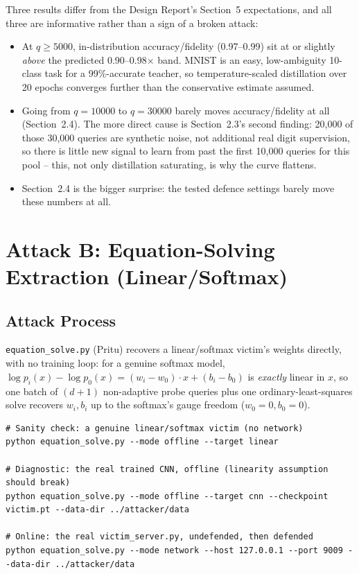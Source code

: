 \documentclass[11pt]{article}
\begin{document}
Three results differ from the Design Report's Section~5 expectations, and
all three are informative rather than a sign of a broken attack:
\begin{itemize}
\item At $q\ge5000$, in-distribution accuracy/fidelity (0.97--0.99) sit at or
  slightly \emph{above} the predicted 0.90--0.98$\times$ band. MNIST is an
  easy, low-ambiguity 10-class task for a 99\%-accurate teacher, so
  temperature-scaled distillation over 20 epochs converges further than the
  conservative estimate assumed.
\item Going from $q=10000$ to $q=30000$ barely moves accuracy/fidelity at
  all (Section~2.4). The more direct cause is Section~2.3's second finding:
  20{,}000 of those 30{,}000 queries are synthetic noise, not additional
  real digit supervision, so there is little new signal to learn from past
  the first 10{,}000 queries for this pool -- this, not only distillation
  saturating, is why the curve flattens.
\item Section~2.4 is the bigger surprise: the tested defence settings
  barely move these numbers at all.
\end{itemize}

\section{Attack B: Equation-Solving Extraction (Linear/Softmax)}

\subsection{Attack Process}

\texttt{equation\_solve.py} (Pritu) recovers a linear/softmax victim's weights
directly, with no training loop: for a genuine softmax model,
$\log p_i(x) - \log p_0(x) = (w_i - w_0)\cdot x + (b_i - b_0)$ is \emph{exactly}
linear in $x$, so one batch of $(d+1)$ non-adaptive probe queries plus one
ordinary-least-squares solve recovers $w_i, b_i$ up to the softmax's gauge
freedom ($w_0 = 0, b_0 = 0$).

\begin{lstlisting}
# Sanity check: a genuine linear/softmax victim (no network)
python equation_solve.py --mode offline --target linear

# Diagnostic: the real trained CNN, offline (linearity assumption should break)
python equation_solve.py --mode offline --target cnn --checkpoint victim.pt --data-dir ../attacker/data

# Online: the real victim_server.py, undefended, then defended
python equation_solve.py --mode network --host 127.0.0.1 --port 9009 --data-dir ../attacker/data
\end{lstlisting}
\end{document}
